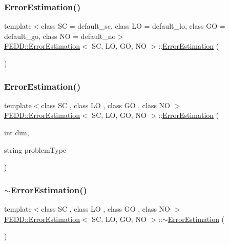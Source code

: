 \subsubsection{\texorpdfstring{Error\+Estimation()}{ErrorEstimation()}\hspace{0.1cm}{\footnotesize\ttfamily [1/2]}}
{\footnotesize\ttfamily template$<$class SC = default\+\_\+sc, class LO = default\+\_\+lo, class GO = default\+\_\+go, class NO = default\+\_\+no$>$ \\
\hyperlink{classFEDD_1_1ErrorEstimation}{F\+E\+D\+D\+::\+Error\+Estimation}$<$ SC, LO, GO, NO $>$\+::\hyperlink{classFEDD_1_1ErrorEstimation}{Error\+Estimation} (\begin{DoxyParamCaption}{ }\end{DoxyParamCaption})}

\mbox{\label{classFEDD_1_1ErrorEstimation_af56fe03f577d1b1ea7fc9ae970333ce3}} 
\subsubsection{\texorpdfstring{Error\+Estimation()}{ErrorEstimation()}\hspace{0.1cm}{\footnotesize\ttfamily [2/2]}}
{\footnotesize\ttfamily template$<$class SC , class LO , class GO , class NO $>$ \\
\hyperlink{classFEDD_1_1ErrorEstimation}{F\+E\+D\+D\+::\+Error\+Estimation}$<$ SC, LO, GO, NO $>$\+::\hyperlink{classFEDD_1_1ErrorEstimation}{Error\+Estimation} (\begin{DoxyParamCaption}\item[{int}]{dim,  }\item[{string}]{problem\+Type }\end{DoxyParamCaption})}

\mbox{\label{classFEDD_1_1ErrorEstimation_a98bcec4b2275c1f1a32607f9b427e884}} 
\subsubsection{\texorpdfstring{$\sim$\+Error\+Estimation()}{~ErrorEstimation()}}
{\footnotesize\ttfamily template$<$class SC , class LO , class GO , class NO $>$ \\
\hyperlink{classFEDD_1_1ErrorEstimation}{F\+E\+D\+D\+::\+Error\+Estimation}$<$ SC, LO, GO, NO $>$\+::$\sim$\hyperlink{classFEDD_1_1ErrorEstimation}{Error\+Estimation} (\begin{DoxyParamCaption}{ }\end{DoxyParamCaption})}



